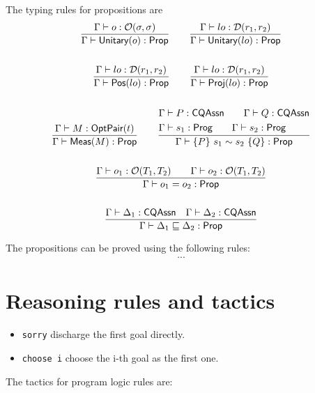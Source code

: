 The typing rules for propositions are
\begin{gather*}
    \frac{\Gamma \vdash o : \mathcal{O}(\sigma, \sigma)}{\Gamma \vdash \textsf{Unitary}({o}) : \textsf{Prop}} 
    \qquad
    \frac{\Gamma \vdash lo : \mathcal{D}(r_1, r_2)}{\Gamma \vdash \textsf{Unitary}({lo}) : \textsf{Prop}} 
    \\
    \\
    \frac{\Gamma \vdash lo : \mathcal{D}(r_1, r_2)}{\Gamma \vdash \textsf{Pos}({lo}) : \textsf{Prop}} 
    \qquad
    \frac{\Gamma \vdash lo : \mathcal{D}(r_1, r_2)}{\Gamma \vdash \textsf{Proj}({lo}) : \textsf{Prop}} \\
    \\
    \frac{\Gamma \vdash M : \textsf{OptPair}(t)}{\Gamma \vdash \textsf{Meas}(M) : \textsf{Prop}}
    \qquad
    \frac{
        \begin{aligned}
            & \Gamma \vdash P : \textsf{CQAssn} \qquad \Gamma \vdash Q : \textsf{CQAssn} \\
            & \Gamma \vdash s_1 : \textsf{Prog} \qquad \Gamma \vdash s_2 : \textsf{Prog}
        \end{aligned}}
        {
            \Gamma \vdash \{P\}~s_1 \sim s_2~\{Q\} : \textsf{Prop}
        } \\
    \\
    \frac{\Gamma \vdash o_1 : \mathcal{O}(T_1, T_2) \qquad \Gamma \vdash o_2 : \mathcal{O}(T_1, T_2)}{\Gamma \vdash o_1 = o_2 : \textsf{Prop}} \\
    \\
    \frac{\Gamma \vdash \Delta_1 : \textsf{CQAssn} \quad \Gamma \vdash \Delta_2 : \textsf{CQAssn}}{\Gamma \vdash \Delta_1 \sqsubseteq \Delta_2 : \textsf{Prop}}
\end{gather*}


The propositions can be proved using the following rules:
\begin{gather*}
    ...
\end{gather*}

\section{Reasoning rules and tactics}

\begin{itemize}
    \item \texttt{sorry} discharge the first goal directly.
    \item \texttt{choose i} choose the i-th goal as the first one.
\end{itemize}

The tactics for program logic rules are:

